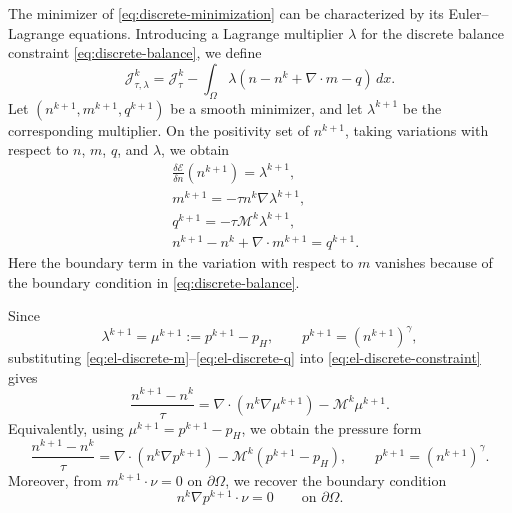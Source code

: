 \documentclass[11pt]{article}
\theoremstyle{plain}
\numberwithin{equation}{section}
\begin{document}
The minimizer of \eqref{eq:discrete-minimization} can be characterized by
its Euler--Lagrange equations. Introducing a Lagrange multiplier
\(\lambda\) for the discrete balance constraint \eqref{eq:discrete-balance},
we define
\[
    \mathcal J_{\tau,\lambda}^k
    =
    \mathcal J_\tau^k
    -
    \int_\Omega
    \lambda\left(n-n^k+\nabla\cdot m-q\right)\,dx .
\]
Let \((n^{k+1},m^{k+1},q^{k+1})\) be a smooth minimizer, and let
\(\lambda^{k+1}\) be the corresponding multiplier. 
On the positivity set of $n^{k+1}$, taking variations with
respect to \(n\), \(m\), \(q\), and \(\lambda\), we obtain
\begin{align}
    &\frac{\delta\mathcal E}{\delta n}(n^{k+1})
    =\lambda^{k+1},
    \label{eq:el-discrete-n}\\
    &m^{k+1}=-\tau n^k\nabla\lambda^{k+1},
    \label{eq:el-discrete-m}\\
    &q^{k+1}=-\tau\mathcal M^k\lambda^{k+1},
    \label{eq:el-discrete-q}\\
    &n^{k+1}-n^k+\nabla\cdot m^{k+1}=q^{k+1}.
    \label{eq:el-discrete-constraint}
\end{align}
Here the boundary term in the variation with respect to \(m\) vanishes
because of the boundary condition in \eqref{eq:discrete-balance}.

Since
\[
    \lambda^{k+1}
    =
    \mu^{k+1}
    :=
    p^{k+1}-p_H,
    \qquad
    p^{k+1}=(n^{k+1})^\gamma ,
\]
substituting \eqref{eq:el-discrete-m}--\eqref{eq:el-discrete-q} into
\eqref{eq:el-discrete-constraint} gives
\begin{equation}\label{eq:time-discrete-scheme}
    \frac{n^{k+1}-n^k}{\tau}
    =
    \nabla\cdot\left(n^k\nabla\mu^{k+1}\right)
    -
    \mathcal M^k\mu^{k+1}.
\end{equation}
Equivalently, using \(\mu^{k+1}=p^{k+1}-p_H\), we obtain the pressure form
\begin{equation}\label{eq:time-discrete-scheme-pressure}
    \frac{n^{k+1}-n^k}{\tau}
    =
    \nabla\cdot\left(n^k\nabla p^{k+1}\right)
    -
    \mathcal M^k\left(p^{k+1}-p_H\right),
    \qquad
    p^{k+1}=(n^{k+1})^\gamma .
\end{equation}
Moreover,  from \(m^{k+1}\cdot\nu=0\) on $\partial \Omega$, we recover the boundary condition 
\begin{equation}\label{eq:time-discrete-boundary}
    n^k\nabla p^{k+1}\cdot\nu=0
    \qquad \text{on }\partial\Omega .
\end{equation}
\end{document}
